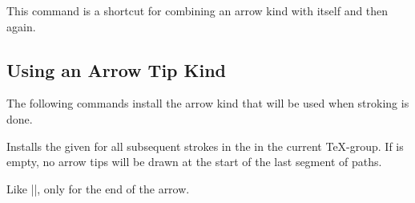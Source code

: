 \begin{command}{\pgfarrowsdeclaretriple{}}
  This command is a shortcut for combining an arrow kind with itself
  and then again.

\begin{codeexample}[]
%
\end{codeexample}
\end{command}





\subsection{Using an Arrow Tip Kind}

The following commands install the arrow kind that will be used when
stroking is done.

\begin{command}{\pgfsetarrowsstart{}}
  Installs the given  for all subsequent
  strokes in the in the current \TeX-group. If 
  is empty, no arrow tips will be drawn at the start of the last
  segment of paths.
\begin{codeexample}[]
\end{codeexample}
\end{command}

\begin{command}{\pgfsetarrowsend{}}
  Like |\pgfsetarrowsstart|, only for the end of the arrow.
\begin{codeexample}[]
\end{codeexample}
\end{command}

